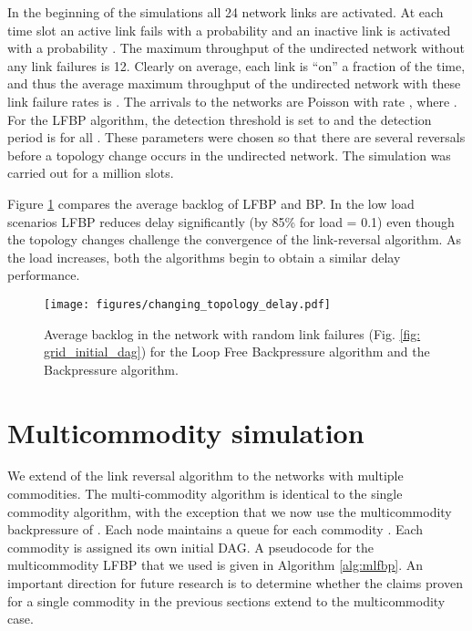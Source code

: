 \documentclass{sig-alternate-2013}
\begin{document}
In the beginning of the simulations  all 24 network links are activated. At each time slot an active link fails with a probability  and an inactive link is activated with a probability . The maximum throughput of the undirected network without any link failures is 12. Clearly on average, each link is ``on'' a fraction  of the time, and thus the average maximum throughput of the undirected network with these link failure rates is . 
The arrivals to the networks are Poisson with rate , where . For the LFBP algorithm, the detection threshold is set to  and the detection period is   for all . These parameters were chosen so that there are several reversals before a topology change occurs in the undirected network. The simulation was carried out for a million slots. 

Figure \ref{fig: changing_topology_delay} compares the average backlog of LFBP and BP. In the low load scenarios  LFBP reduces delay significantly (by 85\% for load = 0.1) even though the topology changes challenge the convergence of the link-reversal algorithm. As the load increases, both the algorithms begin to obtain a similar delay performance.

\begin{figure}[h]
\centering
\texttt{[image: figures/changing\_topology\_delay.pdf]}
\caption{Average backlog in the network with random link failures (Fig. \ref{fig: grid_initial_dag}) for the Loop Free Backpressure algorithm and the Backpressure algorithm.}
\label{fig: changing_topology_delay}
\end{figure}


\section{Multicommodity simulation}
We extend of the link reversal algorithm to the networks with multiple commodities. The multi-commodity algorithm is identical to the single commodity algorithm, with the exception that we now use the multicommodity backpressure of \cite{tassiulas}. Each node  maintains a queue  for each commodity . Each commodity is assigned its own initial DAG. A pseudocode for the multicommodity LFBP that we used is given in Algorithm \ref{alg:mlfbp}. An important direction for future research is to determine whether the claims proven for a single commodity in the previous sections extend to the multicommodity case.
\end{document}

